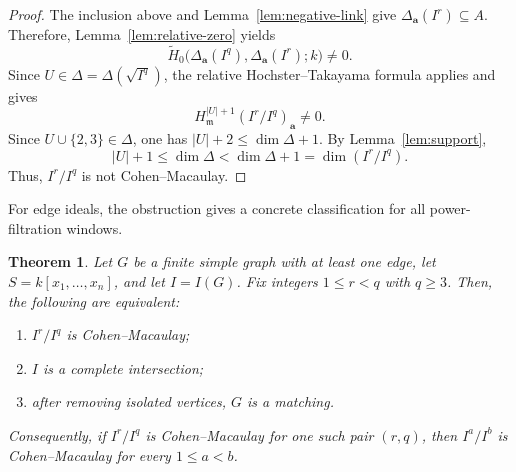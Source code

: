 \documentclass[10pt,a4paper]{amsart}
\newtheorem{theorem}{Theorem}[section]
\begin{document}
\begin{proof}
The inclusion above and Lemma~\ref{lem:negative-link} give
$\Delta_{\mathbf a}(I^r)\subseteq A$. Therefore,
Lemma~\ref{lem:relative-zero} yields
$$
\widetilde H_0
\bigl(\Delta_{\mathbf a}(I^q),\Delta_{\mathbf a}(I^r);k\bigr)
\neq0.
$$
Since $U\in\Delta=\Delta(\sqrt{I^q})$, the relative
Hochster--Takayama formula applies and gives
$$
H_{\mathfrak m}^{|U|+1}(I^r/I^q)_{\mathbf a}\neq0.
$$
Since $U\cup\{2,3\}\in\Delta$, one has
$|U|+2\le\dim\Delta+1$. By Lemma~\ref{lem:support},
$$
|U|+1\le\dim\Delta<\dim\Delta+1=\dim(I^r/I^q).
$$
Thus, $I^r/I^q$ is not Cohen--Macaulay.
\end{proof}

For edge ideals, the obstruction gives a concrete classification for all
power-filtration windows.


\begin{theorem}\label{CM-edge-ideals}
Let $G$ be a finite simple graph with at least one edge, let
$S=k[x_1,\ldots,x_n]$, and let $I=I(G)$. Fix integers $1\le r<q$ with
$q\ge3$. Then, the following are equivalent:
\begin{enumerate}
\item $I^r/I^q$ is Cohen--Macaulay;
\item $I$ is a complete intersection;
\item after removing isolated vertices, $G$ is a matching.
\end{enumerate}
Consequently, if $I^r/I^q$ is Cohen--Macaulay for one such pair $(r,q)$,
then $I^a/I^b$ is Cohen--Macaulay for every $1\le a<b$.
\end{theorem}
\end{document}
